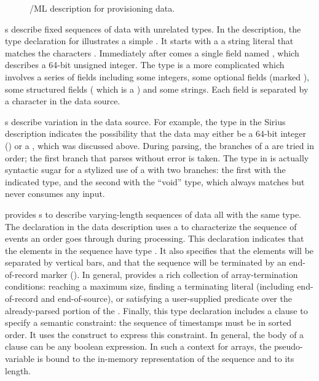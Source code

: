 \documentclass[11pt]{article}
\begin{document}
\begin{figure}
\begin {code}

\end{code}
\caption{\pads{}/ML description for \dibbler{} provisioning data.}
\label{figure:dibblerml}
\end{figure}

s describe fixed sequences of data with unrelated types.
In the \dibbler{} description, the type declaration for
 illustrates a simple . It starts with a 
a string literal that matches the characters .  Immediately after
comes a single field named , which describes a 64-bit unsigned integer.
The type  is a more complicated  which involves
a series of fields including some integers, some optional fields (marked ), some 
structured fields ( which is a ) and some strings.
Each field is separated by a \cd{|} character in the data source.


s describe variation in the data source.  For example, the
 type in the Sirius description indicates the possibility that
the data may either be a 64-bit integer () or a
, which was discussed above.  During parsing, 
the branches of a  are tried in order; the first branch that 
parses without error is taken.  
The  type in  is actually syntactic sugar for a 
stylized use of a  with two branches: the first with the indicated type, 
and the second with the ``void'' type, which  
always matches but never consumes any input.


\pads{} provides s to describe varying-length sequences of data all 
with the same type.  The  declaration in the \dibbler{} data description
uses a  to characterize the sequence of events an
order goes through during processing.  This declaration indicates that the elements
in the sequence have type .  It also specifies that the elements will
be separated by vertical bars, and that the sequence will be terminated by 
an end-of-record marker ().  In general, \pads{} provides a rich collection
of array-termination conditions: reaching a maximum size, finding a terminating
literal (including end-of-record and end-of-source),
or satisfying a user-supplied predicate over the already-parsed portion of 
the .  Finally, this type declaration includes a  clause
to specify a semantic constraint:  
the sequence of timestamps must be in sorted order.
It uses the  construct to express this constraint.
In general, the body of a  clause can be any boolean expression.
In such a context for arrays, the pseudo-variable  is bound to the in-memory representation of the sequence and  to its length.
\end{document}

